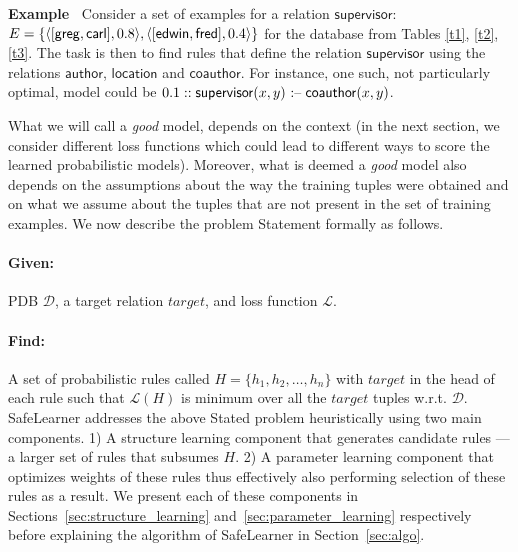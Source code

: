 \documentclass[akbc,twoside,11pt]{article}
\newcounter{example}
\newenvironment{example}[1][]{\refstepcounter{example}\par\medskip\noindent
   \textbf{Example~\theexample #1} \rmfamily}{\medskip}
\newcommand{\ondrej}[1]{\textcolor{red}{O: {#1}}}
\newcommand{\algorithmname}{SafeLearner\xspace}
\begin{document}
\begin{example}
Consider a set of examples for a relation $\mathsf{supervisor}$: $E = \{ \langle [\mathsf{greg}, \mathsf{carl}], 0.8 \rangle,\\ \langle [\mathsf{edwin}, \mathsf{fred}], 0.4 \rangle \}$ for the database from Tables \ref{t1}, \ref{t2}, \ref{t3}. The task is then to find rules that define the relation $\mathsf{supervisor}$ using the relations $\mathsf{author}$, $\mathsf{location}$ and $\mathsf{coauthor}$. For instance, one such, not particularly optimal, model could be $0.1 :: \mathsf{supervisor}(x,y) \mbox{ \textnormal{:--}}\; \mathsf{coauthor}(x,y)$.
\end{example}

What we will call a {\it good} model, depends on the context (in the next section, we consider different loss functions which could lead to different ways to score the learned probabilistic models). Moreover, what is deemed a {\it good} model also depends on the assumptions about the way the training tuples were obtained and on what we assume about the tuples that are not present in the set of training examples. We now describe the problem Statement formally as follows.

\paragraph{Given:} PDB $\mathcal{D}$, a target relation $target$, and loss function $\mathcal{L}$.

\paragraph{Find:}
A set of probabilistic rules called $H = \{h_1, h_2, \ldots, h_n\}$ with $target$ in the head of each rule such that $\mathcal{L}(H)$ is minimum over all the $target$ tuples w.r.t. $\mathcal{D}$.\\

\noindent \algorithmname addresses the above Stated problem heuristically using two main components. 1) A structure learning component that generates candidate rules --- a larger set of rules that subsumes $H$. 2) A parameter learning component that optimizes weights of these rules thus effectively also performing selection of these rules as a result. We present each of these components in Sections~\ref{sec:structure_learning} and~\ref{sec:parameter_learning} respectively before explaining the algorithm of \algorithmname in Section~\ref{sec:algo}. 
\end{document}
